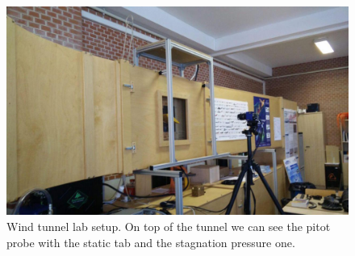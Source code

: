 \documentclass[10pt]{SelfArx} %
\begin{document}


\begin{figure}[!ht]
\includegraphics[width=\linewidth]{photos/tunnel_setup_3} 
\caption{Wind tunnel lab setup. On top of the tunnel we can see the pitot probe with the static tab and the stagnation pressure one.}
\end{figure}
\end{document}
